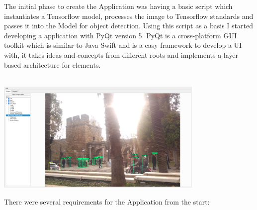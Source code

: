 

The initial phase to create the Application was having a basic script which instantiates a Tensorflow model, processes the image to
Tensorflow standards and passes it into the Model for object detection. Using this script as a basis I started developing a application with
PyQt version 5. PyQt is a cross-platform GUI toolkit which is similar to Java Swift and is a easy framework to develop a UI with, it takes
ideas and concepts from different roots and implements a layer based architecture for elements. \\ \\
\begin{center}
    \includegraphics[width=0.75\textwidth]{images/application/Application.png}
\end{center}
There were several requirements for the Application from the start:
